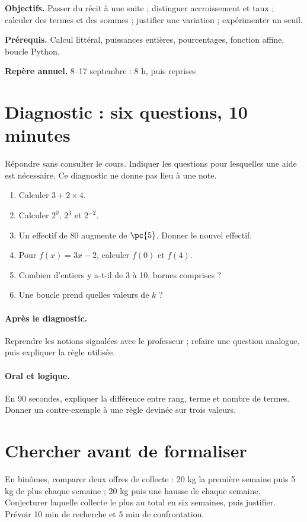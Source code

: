 \label{C01}
\begin{keypoint}
\textbf{Objectifs.} Passer du récit à une suite ; distinguer accroissement et taux ; calculer des termes et des sommes ; justifier une variation ; expérimenter un seuil.

\textbf{Prérequis.} Calcul littéral, puissances entières, pourcentages, fonction affine, boucle Python.

\textbf{Repère annuel.} 8–17 septembre : 8 h, puis reprises\end{keypoint}
\section*{Diagnostic : six questions, 10 minutes}\label{C01-D}
Répondre sans consulter le cours. Indiquer les questions pour lesquelles une aide est nécessaire. Ce diagnostic ne donne pas lieu à une note.
\begin{enumerate}
\item Calculer $3+2\times4$.
\item Calculer $2^0$, $2^3$ et $2^{-2}$.
\item Un effectif de 80 augmente de $\pc{5}$. Donner le nouvel effectif.
\item Pour $f(x)=3x-2$, calculer $f(0)$ et $f(4)$.
\item Combien d’entiers y a-t-il de 3 à 10, bornes comprises ?
\item Une boucle  prend quelles valeurs de $k$ ?
\end{enumerate}
\paragraph{Après le diagnostic.} Reprendre les notions signalées avec le professeur ; refaire une question analogue, puis expliquer la règle utilisée.
\paragraph{Oral et logique.} En 90 secondes, expliquer la différence entre rang, terme et nombre de termes. Donner un contre-exemple à une règle devinée sur trois valeurs.
\mxnewpage
\section*{Chercher avant de formaliser}\label{C01-RECH}
En binômes, comparer deux offres de collecte : 20 kg la première semaine puis 5 kg de plus chaque semaine ; 20 kg puis une hausse de  chaque semaine. Conjecturer laquelle collecte le plus au total en six semaines, puis justifier. Prévoir 10 min de recherche et 5 min de confrontation.
